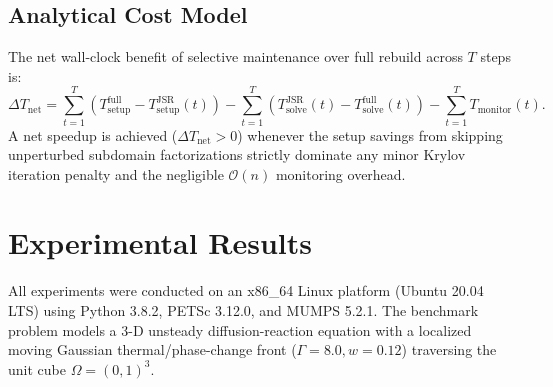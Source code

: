 \documentclass[preprint,12pt,3p]{elsarticle}
\begin{document}
\subsection{Analytical Cost Model}
The net wall-clock benefit of selective maintenance over full rebuild across $T$ steps is:
\begin{equation}
\Delta T_{\text{net}} = \sum_{t=1}^T \left( T_{\text{setup}}^{\text{full}} - T_{\text{setup}}^{\text{JSR}}(t) \right) - \sum_{t=1}^T \left( T_{\text{solve}}^{\text{JSR}}(t) - T_{\text{solve}}^{\text{full}}(t) \right) - \sum_{t=1}^T T_{\text{monitor}}(t).
\label{eq:cost_model}
\end{equation}
A net speedup is achieved ($\Delta T_{\text{net}} > 0$) whenever the setup savings from skipping unperturbed subdomain factorizations strictly dominate any minor Krylov iteration penalty and the negligible $\mathcal{O}(n)$ monitoring overhead.

\section{Experimental Results}
\label{sec:results}

All experiments were conducted on an x86\_64 Linux platform (Ubuntu 20.04 LTS) using Python 3.8.2, PETSc 3.12.0, and MUMPS 5.2.1. The benchmark problem models a 3-D unsteady diffusion-reaction equation with a localized moving Gaussian thermal/phase-change front ($\Gamma = 8.0, w = 0.12$) traversing the unit cube $\Omega = (0, 1)^3$.
\end{document}

